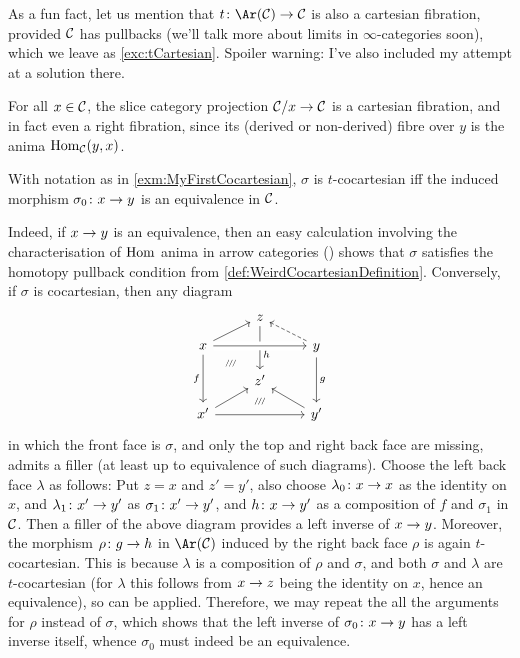 \begin{exm}
\begin{alphanumerate}
		As a fun fact, let us mention that $t\colon\Ar(\Cc)\morphism\Cc$ is also a cartesian fibration, provided $\mathcal{C}$ has pullbacks (we'll talk more about limits in $\infty$-categories soon), which we leave as \cref{exc:tCartesian}. Spoiler warning: I've also included my attempt at a solution there.
		\item For all $x\in \mathcal{C}$, the slice category projection $\Cc/x\morphism \Cc$ is a cartesian fibration, and in fact even a right fibration, since its (derived or non-derived) fibre over $y$ is the anima $\operatorname{Hom}_{\mathcal{C}}(y,x)$.
	\end{alphanumerate}
\end{exm}
\begin{lem*}\label{lem*:Ar(C)toC}
	With notation as in \cref{exm:MyFirstCocartesian}, $\sigma$ is $t$-cocartesian iff the induced morphism $\sigma_0\colon x\morphism y$ is an equivalence in $\mathcal{C}$.
\end{lem*}
\begin{proof*}
	Indeed, if $x\morphism y$ is an equivalence, then an easy calculation involving the characterisation of $\operatorname{Hom}$ anima in arrow categories (\cite[Proposition~VIII.5]{HigherCatsII}) shows that $\sigma$ satisfies the homotopy pullback condition from \cref{def:WeirdCocartesianDefinition}. Conversely, if $\sigma$ is cocartesian, then any diagram
	\begin{equation*}
		\begin{tikzcd}[row sep=small]
			& z\ar[dd,"h",pos=0.65] & \\
			x\ar[dd,"f"']\urar\ar[rr,crossing over]\drar[phantom,"\scriptscriptstyle /\!/\!/"] & & y\ar[dd,"g"]\ular[dashed]\\
			& z'\dar[phantom,"\scriptscriptstyle /\!/\!/",pos=0.65] & \\
			x'\urar\ar[rr] & \phantom{x} & y'\ular
		\end{tikzcd}
	\end{equation*}
	in which the front face is $\sigma$, and only the top and right back face are missing, admits a filler (at least up to equivalence of such diagrams). Choose the left back face $\lambda$ as follows: Put $z=x$ and $z'=y'$, also choose $\lambda_0\colon x\morphism x$ as the identity on $x$, and $\lambda_1\colon x'\morphism y'$ as $\sigma_1\colon x'\morphism y'$, and $h\colon x\morphism y'$ as a composition of $f$ and $\sigma_1$ in $\mathcal{C}$. Then a filler of the above diagram provides a left inverse of $x\morphism y$. Moreover, the morphism $\rho\colon g\morphism h$ in $\Ar(\Cc)$ induced by the right back face $\rho$ is again $t$-cocartesian. This is because $\lambda$ is a composition of $\rho$ and $\sigma$, and both $\sigma$ and $\lambda$ are $t$-cocartesian (for $\lambda$ this follows from $x\morphism z$ being the identity on $x$, hence an equivalence), so \cite[Proposition~IX.5]{HigherCatsII} can be applied. Therefore, we may repeat the all the arguments for $\rho$ instead of $\sigma$, which shows that the left inverse of $\sigma_0\colon x\morphism y$ has a left inverse itself, whence $\sigma_0$ must indeed be an equivalence.
\end{proof*}

